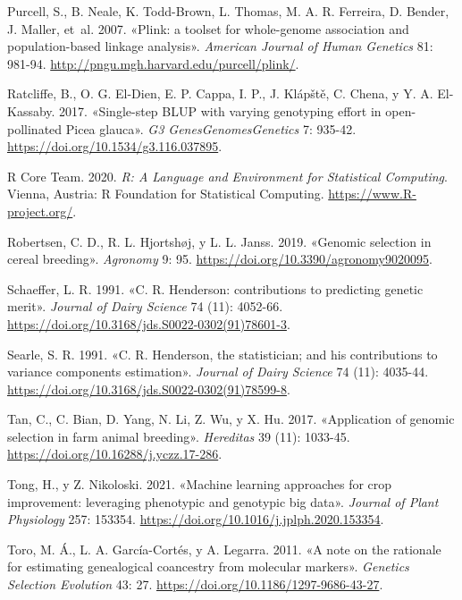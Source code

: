 \documentclass[11pt,spanish,a4paper,oneside,]{book} %
\begin{document}
\leavevmode\hypertarget{ref-cite:49}{}%
Purcell, S., B. Neale, K. Todd-Brown, L. Thomas, M. A. R. Ferreira, D. Bender, J. Maller, et~al. 2007. «Plink: a toolset for whole-genome association and population-based linkage analysis». \emph{American Journal of Human Genetics} 81: 981-94. \url{http://pngu.mgh.harvard.edu/purcell/plink/}.

\leavevmode\hypertarget{ref-cite:72}{}%
Ratcliffe, B., O. G. El-Dien, E. P. Cappa, I. P., J. Klápště, C. Chena, y Y. A. El-Kassaby. 2017. «Single-step BLUP with varying genotyping effort in open-pollinated Picea glauca». \emph{G3 Genes\textbar{}Genomes\textbar{}Genetics} 7: 935-42. \url{https://doi.org/10.1534/g3.116.037895}.

\leavevmode\hypertarget{ref-cite:52}{}%
R Core Team. 2020. \emph{R: A Language and Environment for Statistical Computing}. Vienna, Austria: R Foundation for Statistical Computing. \url{https://www.R-project.org/}.

\leavevmode\hypertarget{ref-cite:63}{}%
Robertsen, C. D., R. L. Hjortshøj, y L. L. Janss. 2019. «Genomic selection in cereal breeding». \emph{Agronomy} 9: 95. \url{https://doi.org/10.3390/agronomy9020095}.

\leavevmode\hypertarget{ref-cite:27}{}%
Schaeffer, L. R. 1991. «C. R. Henderson: contributions to predicting genetic merit». \emph{Journal of Dairy Science} 74 (11): 4052-66. \url{https://doi.org/10.3168/jds.S0022-0302(91)78601-3}.

\leavevmode\hypertarget{ref-cite:29}{}%
Searle, S. R. 1991. «C. R. Henderson, the statistician; and his contributions to variance components estimation». \emph{Journal of Dairy Science} 74 (11): 4035-44. \url{https://doi.org/10.3168/jds.S0022-0302(91)78599-8}.

\leavevmode\hypertarget{ref-cite:34}{}%
Tan, C., C. Bian, D. Yang, N. Li, Z. Wu, y X. Hu. 2017. «Application of genomic selection in farm animal breeding». \emph{Hereditas} 39 (11): 1033-45. \url{https://doi.org/10.16288/j.yczz.17-286}.

\leavevmode\hypertarget{ref-cite:7}{}%
Tong, H., y Z. Nikoloski. 2021. «Machine learning approaches for crop improvement: leveraging phenotypic and genotypic big data». \emph{Journal of Plant Physiology} 257: 153354. \url{https://doi.org/10.1016/j.jplph.2020.153354}.

\leavevmode\hypertarget{ref-cite:71}{}%
Toro, M. Á., L. A. García-Cortés, y A. Legarra. 2011. «A note on the rationale for estimating genealogical coancestry from molecular markers». \emph{Genetics Selection Evolution} 43: 27. \url{https://doi.org/10.1186/1297-9686-43-27}.
\end{document}

